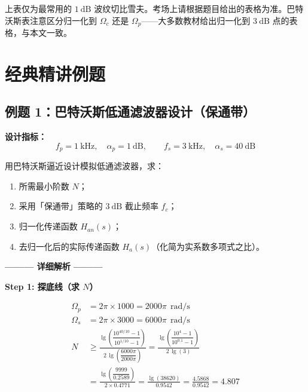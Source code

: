 \documentclass[12pt,a4paper]{ctexart}
\newcommand{\Omegac}{\Omega_c}
\newcommand{\Omegap}{\Omega_p}
\newcommand{\db}{\ \mathrm{dB}}
\newcommand{\rads}{\ \mathrm{rad/s}}
\newcommand{\Han}{H_{\!a}(s)}
\newcommand{\HanNorm}{H_{\!an}(s)}
\begin{document}
\vspace{8pt}
\begin{pitfall}
上表仅为最常用的 $1\db$ 波纹切比雪夫。考场上请根据题目给出的表格为准。巴特沃斯表注意区分归一化到 $\Omegac$ 还是 $\Omegap$——大多数教材给出归一化到 $3\db$ 点的表格，与本文一致。
\end{pitfall}

\newpage
\section{经典精讲例题}

\subsection{例题 1：巴特沃斯低通滤波器设计（保通带）}

\begin{tcolorbox}[enhanced, colback=white, colframe=butterworth!60,
    title={\textbf{题目}}, fonttitle=\bfseries, sharp corners, breakable]

\textbf{设计指标：}
\[
f_p = 1\ \mathrm{kHz},\quad \alpha_p = 1\db,\qquad
f_s = 3\ \mathrm{kHz},\quad \alpha_s = 40\db
\]

用巴特沃斯逼近设计模拟低通滤波器，求：
\begin{enumerate}[label=(\arabic*)]
    \item 所需最小阶数 $N$；
    \item 采用「保通带」策略的 $3\db$ 截止频率 $f_c$；
    \item 归一化传递函数 $\HanNorm$；
    \item 去归一化后的实际传递函数 $\Han$（化简为实系数多项式之比）。
\end{enumerate}
\end{tcolorbox}

\vspace{8pt}

\begin{center}
    \textbf{——— 详细解析 ———}
\end{center}

\textbf{\color{butterworth!90}Step 1: 探底线（求 $N$）}

\begin{align*}
\Omega_p &= 2\pi \times 1000 = 2000\pi \ \rads \\
\Omega_s &= 2\pi \times 3000 = 6000\pi \ \rads \\[4pt]
N &\ge \frac{\lg\!\left(\dfrac{10^{40/10}-1}{10^{1/10}-1}\right)}
                {2\,\lg\!\left(\dfrac{6000\pi}{2000\pi}\right)}
     = \frac{\lg\!\left(\dfrac{10^4-1}{10^{0.1}-1}\right)}
                {2\,\lg(3)} \\[4pt]
  &= \frac{\lg\!\left(\dfrac{9999}{0.2589}\right)}{2 \times 0.4771}
     = \frac{\lg(38620)}{0.9542}
     = \frac{4.5868}{0.9542}
     = 4.807
\end{align*}
\end{document}
